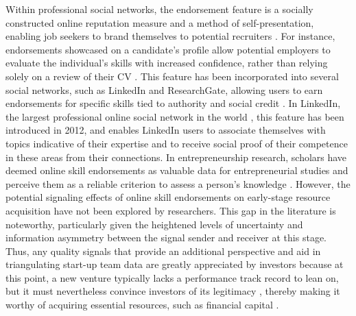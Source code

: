 \documentclass[12pt]{article}
\begin{document}
Within professional social networks, the endorsement feature is a socially constructed online reputation measure and a method of self-presentation, enabling job seekers to brand themselves to potential recruiters \citep{rapanta2017linkedin}. For instance, endorsements showcased on a candidate's profile allow potential employers to evaluate the individual's skills with increased confidence, rather than relying solely on a review of their CV \citep{drakopoulos2020building, perez2016endorsement, yan2019social}. This feature has been incorporated into several social networks, such as LinkedIn and ResearchGate, allowing users to earn endorsements for specific skills tied to authority and social credit \citep{perez2016endorsement, rapanta2017linkedin, wu2018analysis}. In LinkedIn, the largest professional online social network in the world \citep{wu2018analysis}, this feature has been introduced in 2012, and enables LinkedIn users to associate themselves with topics indicative of their expertise and to receive social proof of their competence in these areas from their connections. In entrepreneurship research, scholars have deemed online skill endorsements as valuable data for entrepreneurial studies and perceive them as a reliable criterion to assess a person's knowledge \citep{gasiorowski2022pay, reese2020should, sako2020scaling}. However, the potential signaling effects of online skill endorsements on early-stage resource acquisition have not been explored by researchers. This gap in the literature is noteworthy, particularly given the heightened levels of uncertainty \citep{matusik2008values} and information asymmetry between the signal sender and receiver \citep{harrer2022reducing, spence2002signaling} at this stage. Thus, any quality signals that provide an additional perspective and aid in triangulating start-up team data are greatly appreciated by investors because at this point, a new venture typically lacks a performance track record to lean on, but it must nevertheless convince investors of its legitimacy \citep{becker2015new}, thereby making it worthy of acquiring essential resources, such as financial capital \citep{ko2018signaling}.
\end{document}
